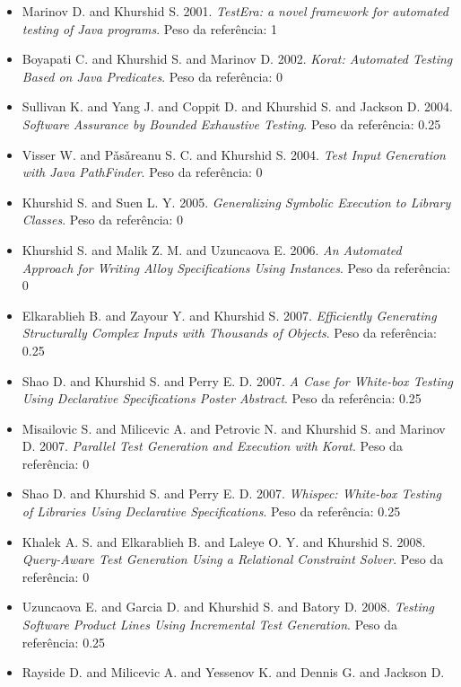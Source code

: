 \begin{itemize}
\item Marinov D. and Khurshid S.
      2001.
      {\it TestEra: a novel framework for automated testing of Java programs}.
      Peso da referência: 1
\item Boyapati C. and Khurshid S. and Marinov D.
      2002.
      {\it Korat: Automated Testing Based on Java Predicates}.
      Peso da referência: 0
\item Sullivan K. and Yang J. and Coppit D. and Khurshid S. and Jackson D.
      2004.
      {\it Software Assurance by Bounded Exhaustive Testing}.
      Peso da referência: 0.25
\item Visser W. and P\v{a}s\v{a}reanu S. C. and Khurshid S.
      2004.
      {\it Test Input Generation with Java PathFinder}.
      Peso da referência: 0
\item Khurshid S. and Suen L. Y.
      2005.
      {\it Generalizing Symbolic Execution to Library Classes}.
      Peso da referência: 0
\item Khurshid S. and Malik Z. M. and Uzuncaova E.
      2006.
      {\it An Automated Approach for Writing Alloy Specifications Using Instances}.
      Peso da referência: 0
\item Elkarablieh B. and Zayour Y. and Khurshid S.
      2007.
      {\it Efficiently Generating Structurally Complex Inputs with Thousands of Objects}.
      Peso da referência: 0.25
\item Shao D. and Khurshid S. and Perry E. D.
      2007.
      {\it A Case for White-box Testing Using Declarative Specifications Poster Abstract}.
      Peso da referência: 0.25
\item Misailovic S. and Milicevic A. and Petrovic N. and Khurshid S. and Marinov D.
      2007.
      {\it Parallel Test Generation and Execution with Korat}.
      Peso da referência: 0
\item Shao D. and Khurshid S. and Perry E. D.
      2007.
      {\it Whispec: White-box Testing of Libraries Using Declarative Specifications}.
      Peso da referência: 0.25
\item Khalek A. S. and Elkarablieh B. and Laleye O. Y. and Khurshid S.
      2008.
      {\it Query-Aware Test Generation Using a Relational Constraint Solver}.
      Peso da referência: 0
\item Uzuncaova E. and Garcia D. and Khurshid S. and Batory D.
      2008.
      {\it Testing Software Product Lines Using Incremental Test Generation}.
      Peso da referência: 0.25
\item Rayside D. and Milicevic A. and Yessenov K. and Dennis G. and Jackson D.

\end{itemize}
